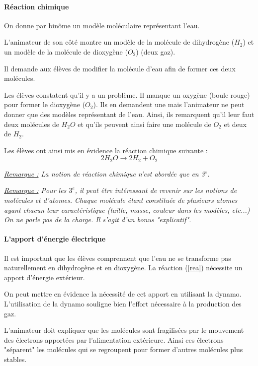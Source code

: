 \documentclass[a4paper, 11pt, twoside]{article}
\numberwithin{equation}{subsection}
\newcommand{\rem}[1]{\textit{\underline{Remarque :} #1}}
\begin{document}
		\paragraph{Réaction chimique\\}
		
		On donne par binôme un modèle moléculaire représentant l'eau.
				
		L'animateur de son côté montre un modèle de la molécule de dihydrogène ($H_2$) et un modèle de la molécule de dioxygène ($O_2$) (deux gaz).
		
		Il demande aux élèves de modifier la molécule d'eau afin de former ces deux molécules.
		
		Les élèves constatent qu'il y a un problème. Il manque un oxygène (boule rouge) pour former le dioxygène ($O_2$). Ils en demandent une mais l'animateur ne peut donner que des modèles représentant de l'eau. Ainsi, ils remarquent qu'il leur faut deux molécules de $H_2O$ et qu'ils peuvent ainsi faire une molécule de $O_2$ et deux de $H_2$. 
		
		Les élèves ont ainsi mis en évidence la réaction chimique suivante :
		\begin{equation} \label{rea}
			2H_2O \rightarrow 2H_2 + O_2
		\end{equation}
		\newpage
		
		\rem{La notion de réaction chimique n'est abordée que en 3$^{e}$.}
		
		\rem{Pour les $3^{e}$, il peut être intéressant de revenir sur les notions de molécules et d'atomes. Chaque molécule étant constituée de plusieurs atomes ayant chacun leur caractéristique (taille, masse, couleur dans les modèles, etc...) On ne parle pas de la charge. Il s'agit d'un bonus "explicatif".}
		
		\paragraph{L'apport d'énergie électrique\\}
		
		Il est important que les élèves comprennent que l'eau ne se transforme pas naturellement en dihydrogène et en dioxygène. La réaction (\ref{rea}) nécessite un apport d'énergie extérieur.
		
		On peut mettre en évidence la nécessité de cet apport en utilisant la dynamo. L'utilisation de la dynamo souligne bien l'effort nécessaire à la production des gaz.
		
		L'animateur doit expliquer que les molécules sont fragilisées par le mouvement des électrons apportées par l'alimentation extérieure. Ainsi ces électrons "séparent" les molécules qui se regroupent pour former d'autres molécules plus stables.
		
\end{document}
